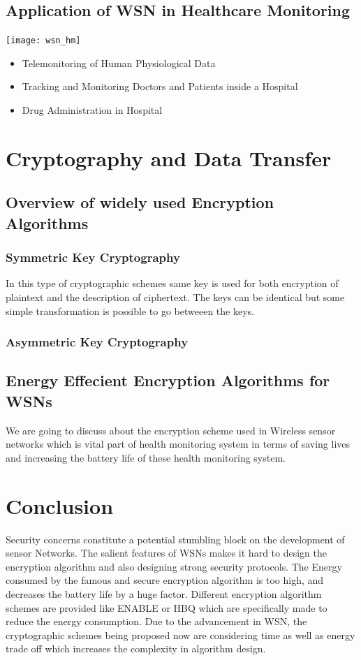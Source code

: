 \documentclass[conference]{IEEEtran}
\begin{document}
\subsection{Application of WSN in Healthcare Monitoring}
\texttt{[image: wsn\_hm]}
\linebreak
\begin{itemize}
  \item Telemonitoring of Human Physiological Data
  \item Tracking and Monitoring Doctors and Patients inside a Hospital
  \item Drug Administration in Hospital
\end{itemize}

\section{Cryptography and Data Transfer}

\subsection{Overview of widely used Encryption Algorithms}
\subsubsection{Symmetric Key Cryptography}
In this type of cryptographic schemes same key is used for both encryption of plaintext and the description of ciphertext. The keys can be identical but some simple transformation is possible to go betweeen the keys.
\subsubsection{Asymmetric Key Cryptography}

\subsection{Energy Effecient Encryption Algorithms for WSNs}
We are going to discuss about the encryption scheme used in Wireless sensor networks which is vital part of health monitoring system in terms of saving lives and increasing the battery life of these health monitoring system.
\section{Conclusion}
Security concerns constitute a potential stumbling block on the development of sensor Networks. The salient features of WSNs makes it hard to design the encryption algorithm and also designing strong security protocols. The Energy consumed by the famous and secure encryption algorithm is too high, and decreases the battery life by a huge factor. Different encryption algorithm schemes are provided like ENABLE or HBQ which are specifically made to reduce the energy consumption. Due to the advancement in WSN, the cryptographic schemes being proposed now are considering time as well as energy trade off which increases the complexity in algorithm design.
\end{document}
